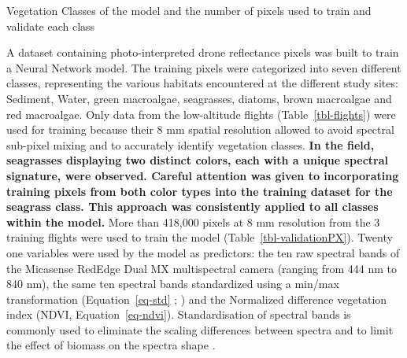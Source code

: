 \documentclass[
  number]{elsarticle}
\begin{document}
\begin{table}

\caption{\label{tbl-validationPX}Vegetation Classes of the model and the
number of pixels used to train and validate each class}


\end{table}%

A dataset containing photo-interpreted drone reflectance pixels was
built to train a Neural Network model. The training pixels were
categorized into seven different classes, representing the various
habitats encountered at the different study sites: Sediment, Water,
green macroalgae, seagrasses, diatoms, brown macroalgae and red
macroalgae. Only data from the low-altitude flights
(Table~\ref{tbl-flights}) were used for training because their 8 mm
spatial resolution allowed to avoid spectral sub-pixel mixing and to
accurately identify vegetation classes. \textbf{In the field, seagrasses
displaying two distinct colors, each with a unique spectral signature,
were observed. Careful attention was given to incorporating training
pixels from both color types into the training dataset for the seagrass
class. This approach was consistently applied to all classes within the
model.} More than 418,000 pixels at 8 mm resolution from the 3 training
flights were used to train the model (Table~\ref{tbl-validationPX}).
Twenty one variables were used by the model as predictors: the ten raw
spectral bands of the Micasense RedEdge Dual MX multispectral camera
(ranging from 444 nm to 840 nm), the same ten spectral bands
standardized using a min/max transformation (Equation~\ref{eq-std} ;
\citep{Cao2017}) and the Normalized difference vegetation index (NDVI,
Equation~\ref{eq-ndvi}). Standardisation of spectral bands is commonly
used to eliminate the scaling differences between spectra and to limit
the effect of biomass on the spectra shape
\citep{Douay2022, Davies2023}.
\end{document}
